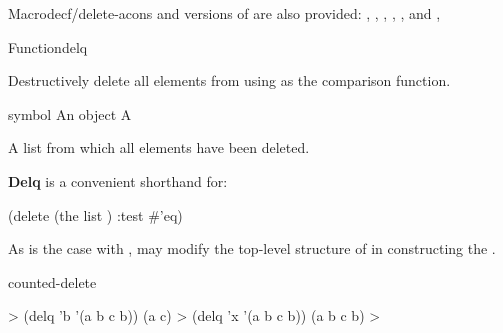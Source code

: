 \documentclass[10pt,twoside,english,pdftex]{article}
\begin{document}
\begin{functiondoc}{Macro}{decf/delete-acons}{%
    }
\fnnote
%
%
%
%
%
%
%
%
 and  versions of  are
also provided: ,
, ,
,
, and
,

\end{functiondoc}


\begin{functiondoc}{Function}{delq}{
    }
%
  
\fnsyntax

\fnpurpose Destructively delete all  elements from 
using  as the comparison function.

\fnpackage {}

\fnmodule {}

\fnargs
\begin{args}{symbol}
\arg[item] An object
\arg[list] A 
\end{args}

\fnreturns A list from which all  elements have been deleted.

\fndescription \textbf{Delq} is a convenient shorthand for:
%
\W\supp
\begin{example}
  (delete  (the list ) :test #'eq)
\end{example}
%
As is the case with ,  may modify the
top-level structure of  in constructing the
.

\begin{alsos}{counted-delete}
\end{alsos}

\fnexamples
\W\supp
\begin{example}
  > (delq 'b '(a b c b))
  (a c)
  > (delq 'x '(a b c b))
  (a b c b)
  >
\end{example}

\end{functiondoc}
\end{document}

